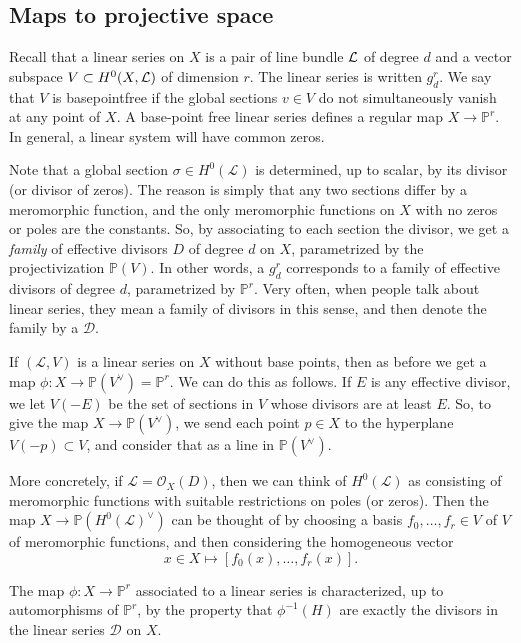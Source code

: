 \documentclass[12pt]{article}
\begin{document}
\subsection{Maps to projective space}
Recall that a linear series on $X$ is a pair of line bundle ${\mathcal{L}}$ of degree $d$ and a vector subspace $V \subset H^0(X, {\mathcal{L}})$ of dimension $r$. The linear series is written $g^r_d$. We say that $V$ is basepointfree if the global sections $v\in V$ do not simultaneously vanish at any point of $X$. A base-point free linear series defines a regular map $X \to \mathbb{P}^r$. In general, a linear system will have common zeros.

Note that a global section $\sigma \in H^0(\mathcal{L})$ is determined, up to scalar, by its divisor (or divisor of zeros). The reason is simply that any two sections differ by a meromorphic function, and the only meromorphic functions on $X$ with no zeros or poles are the constants. So, by associating to each section the divisor, we get a \textit{family} of effective divisors $D$ of degree $d$ on $X$, parametrized by the projectivization $\mathbb{P}(V)$. In other words, a $g_d^r$ corresponds to a family of effective divisors of degree $d$, parametrized by $\mathbb{P}^r$. Very often, when people talk about linear series, they mean a family of divisors in this sense, and then denote the family by a $\mathcal{D}$.

If $(\mathcal{L}, V)$ is a linear series on $X$ without base points, then as before we get a map $\phi : X \to \mathbb{P}(V^\vee) = \mathbb{P}^r$. We can do this as follows. If $E$ is any effective divisor, we let $V(-E)$ be the set of sections in $V$ whose divisors are at least $E$. So, to give the map $X \to \mathbb{P}(V^\vee)$, we send each point $p \in X$ to the hyperplane $V(-p) \subset V$, and consider that as a line in $\mathbb{P}(V^\vee)$.

More concretely, if $\mathcal{L} = \mathcal{O}_X(D)$, then we can think of $H^0(\mathcal{L})$ as consisting of meromorphic functions with suitable restrictions on poles (or zeros). Then the map $X \to \mathbb{P}(H^0(\mathcal{L})^\vee)$ can be thought of by choosing a basis $f_0, \ldots, f_r \in V$ of $V$ of meromorphic functions, and then considering the homogeneous vector
$$x \in X \mapsto [f_0(x), \ldots, f_r(x)].$$

\begin{proposition}
The map $\phi : X \to \mathbb{P}^r$ associated to a linear series is characterized, up to automorphisms of $\mathbb{P}^r$, by the property that $\phi^{-1}(H)$ are exactly the divisors in the linear series $\mathcal{D}$ on $X$.

\end{proposition}
\end{document}

